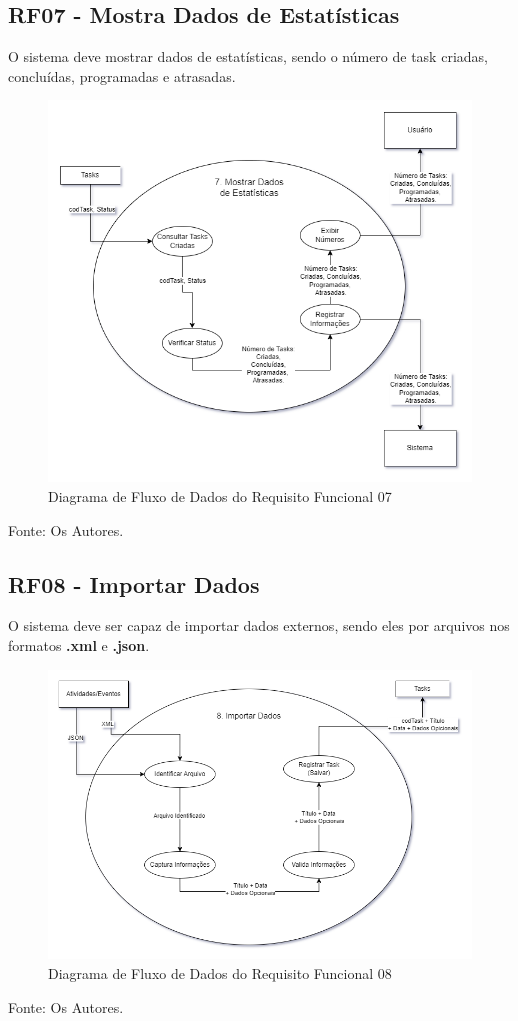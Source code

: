 \documentclass[a4paper,12pt]{article}
\begin{document}
\subsection{RF07 - Mostra Dados de Estatísticas}
O sistema deve mostrar dados de estatísticas, sendo o número de task criadas, concluídas, programadas e atrasadas.
\begin{figure}[H]
	\centering
	\includegraphics[scale=0.45]{DFDs/RF07.drawio.png}
	\caption{Diagrama de Fluxo de Dados do Requisito Funcional 07}
\end{figure}
\noindent Fonte: Os Autores.

\pagebreak
\subsection{RF08 - Importar Dados}
O sistema deve ser capaz de importar dados externos, sendo eles por arquivos nos formatos \textbf{.xml} e \textbf{.json}.
\begin{figure}[H]
	\centering
	\includegraphics[scale=0.45]{DFDs/RF08.drawio.png}
	\caption{Diagrama de Fluxo de Dados do Requisito Funcional 08}
\end{figure}
\noindent Fonte: Os Autores.
\end{document}
